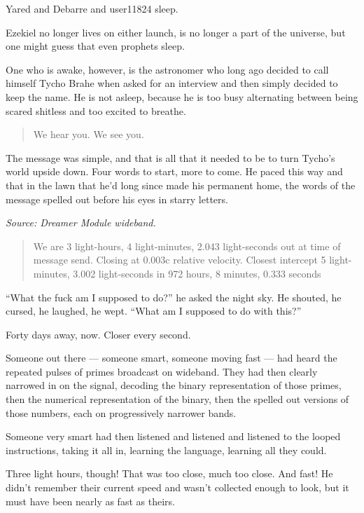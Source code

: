 Yared and Debarre and user11824 sleep.

Ezekiel no longer lives on either launch, is no longer a part of the universe, but one might guess that even prophets sleep.

One who is awake, however, is the astronomer who long ago decided to call himself Tycho Brahe when asked for an interview and then simply decided to keep the name. He is not asleep, because he is too busy alternating between being scared shitless and too excited to breathe.

\begin{quote}
We hear you. We see you.
\end{quote}

The message was simple, and that is all that it needed to be to turn Tycho's world upside down. Four words to start, more to come. He paced this way and that in the lawn that he'd long since made his permanent home, the words of the message spelled out before his eyes in starry letters.

\emph{Source: Dreamer Module wideband.}

\begin{quote}
We are 3 light-hours, 4 light-minutes, 2.043 light-seconds out at time of message send. Closing at 0.003c relative velocity. Closest intercept 5 light-minutes, 3.002 light-seconds in 972 hours, 8 minutes, 0.333 seconds
\end{quote}

``What the fuck am I supposed to do?'' he asked the night sky. He shouted, he cursed, he laughed, he wept. ``What am I supposed to do with this?''

Forty days away, now. Closer every second.

Someone out there — someone smart, someone moving fast — had heard the repeated pulses of primes broadcast on wideband. They had then clearly narrowed in on the signal, decoding the binary representation of those primes, then the numerical representation of the binary, then the spelled out versions of those numbers, each on progressively narrower bands.

Someone very smart had then listened and listened and listened to the looped instructions, taking it all in, learning the language, learning all they could.

Three light hours, though! That was too close, much too close. And fast! He didn't remember their current speed and wasn't collected enough to look, but it must have been nearly as fast as theirs.

